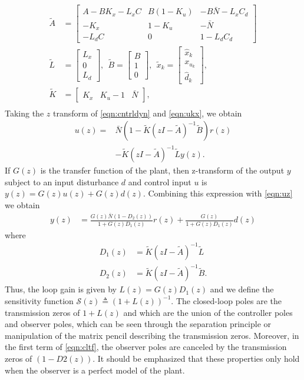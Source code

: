 \documentclass[journal,twocolumn,twoside]{IEEEtran}
\begin{document}
\begin{align*}
  \tilde{A} &= \begin{bmatrix}
    A-BK_x-L_xC & B(1-K_u) & -B\bar{N} - L_xC_d\\
    -K_x        & 1-K_u    & -\bar{N} \\
    -L_dC      & 0        & 1-L_dC_d
  \end{bmatrix}\\
  \tilde{L} &= \begin{bmatrix} L_x \\ 0 \\ L_d  \end{bmatrix},\:\:
  \tilde{B} = \begin{bmatrix} B \\ 1 \\0\end{bmatrix},\:\:
  \tilde{x}_k = \begin{bmatrix} \hat{x}_k \\ x_{u_k} \\ \hat{d}_k\end{bmatrix},\\
  \tilde{K} &= \begin{bmatrix}K_x & K_u-1 & \bar{N}\end{bmatrix},\\
\end{align*}
Taking the $z$ transform of \eqref{eqn:cntrldyn} and \eqref{eqn:ukx}, we obtain
\begin{align}
  u(z) =&  \bar{N}(1-\tilde{K}(zI-\tilde{A})^{-1}\tilde{B})r(z) \label{eqn:uz}\\
       & -\tilde{K}(zI - \tilde{A})^{-1}\tilde{L}y(z).\nonumber
\end{align}
If $G(z)$ is the transfer function of the plant, then z-transform of the output $y$ subject to an input disturbance $d$ and control input $u$ is $y(z) = G(z)u(z) + G(z)d(z)$. Combining this expression with \eqref{eqn:uz} we obtain 
\begin{align}
  y(z) &= \frac{G(z)\bar{N}(1-D_2(z))}{1 + G(z)D_1(z)} r(z) + \frac{G(z)}{1 + G(z)D_1(z)}d(z)\label{eqn:cltf}
\end{align}
where
\begin{align}
  D_1(z) &= \tilde{K}(zI -\tilde{A})^{-1}\tilde{L}\\
  D_2(z) &= \tilde{K}(zI -\tilde{A})^{-1}\tilde{B}.
\end{align}
Thus, the loop gain is given by $L(z) = G(z)D_1(z)$ and we define the sensitivity function $\mathcal{S}(z)\triangleq (1+L(z))^{-1}$. The closed-loop poles are the transmission zeros of $1+L(z)$ and which are the union of the controller poles and observer poles, which can be seen through the separation principle or manipulation of the matrix pencil describing the transmission zeros. Moreover, in the first term of \eqref{eqn:cltf}, the observer poles are canceled by the transmission zeros of $(1-D2(z))$. It should be emphasized that these properties only hold when the observer is a perfect model of the plant. 
\end{document}
